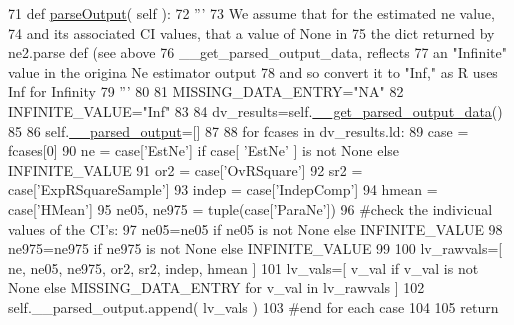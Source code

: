 \begin{DoxyCode}
71     \textcolor{keyword}{def }\hyperlink{classnegui_1_1pgoutputneestimator_1_1PGOutputNeEstimator_a7b6885cf565cb604ab24d7082858f57b}{parseOutput}( self ):
72         \textcolor{stringliteral}{'''}
73 \textcolor{stringliteral}{        We assume that for the estimated ne value,}
74 \textcolor{stringliteral}{        and its associated CI values, that a value of None in}
75 \textcolor{stringliteral}{        the dict returned by ne2.parse def (see above }
76 \textcolor{stringliteral}{        \_\_get\_parsed\_output\_data, reflects}
77 \textcolor{stringliteral}{        an "Infinite" value in the origina Ne estimator output}
78 \textcolor{stringliteral}{        and so convert it to "Inf,"  as R uses Inf for Infinity}
79 \textcolor{stringliteral}{        '''}
80 
81         MISSING\_DATA\_ENTRY=\textcolor{stringliteral}{"NA"}
82         INFINITE\_VALUE=\textcolor{stringliteral}{"Inf"}
83 
84         dv\_results=self.\hyperlink{classnegui_1_1pgoutputneestimator_1_1PGOutputNeEstimator_a70fbaa3f31f7d7c3ec0fdea15e923680}{\_\_get\_parsed\_output\_data}()
85 
86         self.\hyperlink{classnegui_1_1pgoutputneestimator_1_1PGOutputNeEstimator_a3579f427ddfe05902a6f4e3301704191}{\_\_parsed\_output}=[]
87         
88         \textcolor{keywordflow}{for} fcases \textcolor{keywordflow}{in} dv\_results.ld:
89             case = fcases[0] 
90             ne = case[\textcolor{stringliteral}{'EstNe'}]  \textcolor{keywordflow}{if} case[ \textcolor{stringliteral}{'EstNe'} ] \textcolor{keywordflow}{is} \textcolor{keywordflow}{not} \textcolor{keywordtype}{None} \textcolor{keywordflow}{else} INFINITE\_VALUE
91             or2 = case[\textcolor{stringliteral}{'OvRSquare'}] 
92             sr2 = case[\textcolor{stringliteral}{'ExpRSquareSample'}] 
93             indep = case[\textcolor{stringliteral}{'IndepComp'}] 
94             hmean = case[\textcolor{stringliteral}{'HMean'}] 
95             ne05, ne975 = tuple(case[\textcolor{stringliteral}{'ParaNe'}]) 
96             \textcolor{comment}{#check the indivicual values of the CI's:}
97             ne05=ne05 \textcolor{keywordflow}{if} ne05 \textcolor{keywordflow}{is} \textcolor{keywordflow}{not} \textcolor{keywordtype}{None} \textcolor{keywordflow}{else} INFINITE\_VALUE 
98             ne975=ne975 \textcolor{keywordflow}{if} ne975 \textcolor{keywordflow}{is} \textcolor{keywordflow}{not} \textcolor{keywordtype}{None} \textcolor{keywordflow}{else} INFINITE\_VALUE
99 
100             lv\_rawvals=[ ne, ne05, ne975, or2, sr2, indep, hmean  ] 
101             lv\_vals=[ v\_val \textcolor{keywordflow}{if} v\_val \textcolor{keywordflow}{is} \textcolor{keywordflow}{not} \textcolor{keywordtype}{None} \textcolor{keywordflow}{else} MISSING\_DATA\_ENTRY \textcolor{keywordflow}{for} v\_val \textcolor{keywordflow}{in} lv\_rawvals ]
102             self.\_\_parsed\_output.append(  lv\_vals  )
103         \textcolor{comment}{#end for each case}
104             
105         \textcolor{keywordflow}{return}
\end{DoxyCode}


